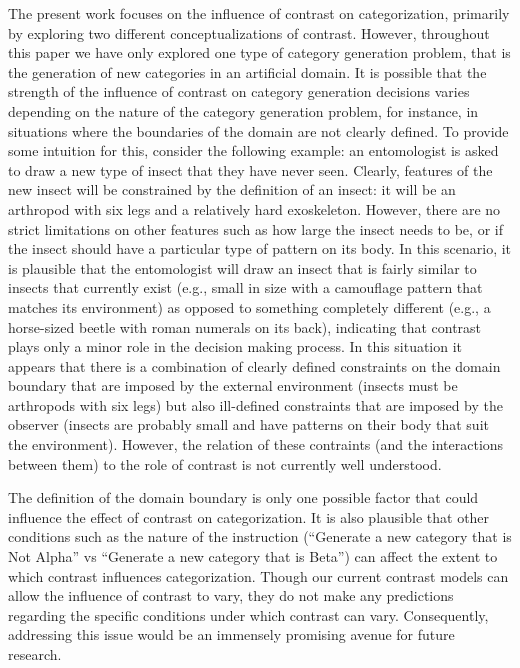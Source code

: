 \documentclass[12pt]{article}
\begin{document}
\begin{flushleft}
The present work focuses on the influence of contrast on categorization,
primarily by exploring two different conceptualizations of contrast. However,
throughout this paper we have only explored one type of category generation
problem, that is the generation of new categories in an
artificial domain. It is possible that the strength of the influence of contrast on
category generation decisions varies depending on the nature of the category
generation problem, for instance, in situations where the boundaries of the
domain are not clearly defined. To provide some intuition for this, consider the
following example: an entomologist is asked to draw a new type of insect that
they have never seen. Clearly, features of the new insect will be constrained by
the definition of an insect: it will be an arthropod with six legs and a
relatively hard exoskeleton. However, there are no strict limitations on other
features such as how large the insect needs to be, or if the insect should have
a particular type of pattern on its body. In this scenario, it is plausible that
the entomologist will draw an insect that is fairly similar to insects that
currently exist (e.g., small in size with a camouflage pattern that matches its
environment) as opposed to something completely different (e.g., a horse-sized
beetle with roman numerals on its back), indicating that contrast plays only a
minor role in the decision making process. In this situation it appears that
there is a combination of clearly defined constraints on the domain boundary
that are imposed by the external environment (insects must be arthropods with
six legs) but also ill-defined constraints that are imposed by the observer
(insects are probably small and have patterns on their body that suit the
environment). However, the relation of these contraints (and the interactions
between them) to the role of contrast is not currently well understood.

The definition of the domain boundary is only one possible factor that could
influence the effect of contrast on categorization. It is also plausible that
other conditions such as the nature of the instruction (``Generate a new
category that is Not Alpha'' vs ``Generate a new category that is Beta'') 
can affect the extent to which contrast influences categorization. Though our
current contrast models can allow the influence of contrast to vary, they do not
make any predictions regarding the specific conditions under which contrast can
vary. Consequently, addressing this issue would be an immensely promising avenue
for future research.


\end{flushleft}
\end{document}
